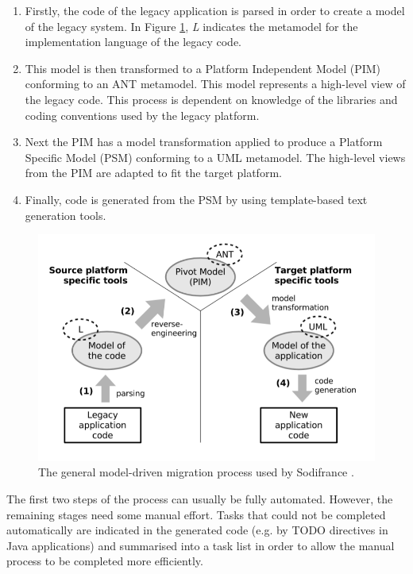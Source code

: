 \documentclass{UoYCSproject}
\begin{document}
\begin{enumerate}
\item Firstly, the code of the legacy application is parsed in order to create a model of the legacy system. In Figure \ref{fig:sodifrance_process}, \textit{L} indicates the metamodel for the implementation language of the legacy code.
\item This model is then transformed to a Platform Independent Model (PIM) conforming to an ANT metamodel. This model represents a high-level view of the legacy code. This process is dependent on knowledge of the libraries and coding conventions used by the legacy platform.
\item Next the PIM has a model transformation applied to produce a Platform Specific Model (PSM) conforming to a UML metamodel. The high-level views from the PIM are adapted to fit the target platform.
\item Finally, code is generated from the PSM by using template-based text generation tools.
\end{enumerate}

\begin{figure}[h!]
  \includegraphics[width=\linewidth]{graphics/sodifrance_mde.png}
  \caption{The general model-driven migration process used by Sodifrance \parencite{fleurey2007model}.}
  \label{fig:sodifrance_process}
\end{figure}

The first two steps of the process can usually be fully automated. However, the remaining stages need some manual effort. Tasks that could not be completed automatically are indicated in the generated code (e.g. by TODO directives in Java applications) and summarised into a task list in order to allow the manual process to be completed more efficiently.
\end{document}
